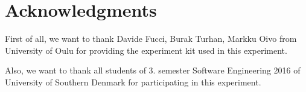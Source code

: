 \documentclass{sig-alternate-05-2015}
\begin{document}



\section{Acknowledgments}

First of all, we want to thank Davide Fucci, Burak Turhan, Markku Oivo from University of Oulu for providing the experiment kit used in this experiment.

Also, we want to thank all students of 3. semester Software Engineering 2016 of University of Southern Denmark for participating in this experiment.
\end{document}
